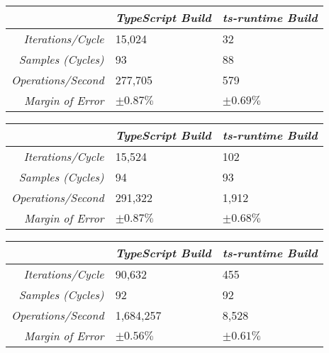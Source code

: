 \begin{center}
{
\centering
\tabulinesep=1.2mm
\setlength{\tabcolsep}{5mm}
\def\arraystretch{1.25}
\small
\begin{tabu} to \textwidth {|r||X[c,m]|X[c,m]|}
  \hline
  & \emph{TypeScript Build} & \emph{ts-runtime Build} \\
  \hline
  \hline
  \emph{Iterations/Cycle}  & 15,024 & 32 \\
  \hline
  \emph{Samples (Cycles)}  & 93 & 88 \\
  \hline
  \emph{Operations/Second} & 277,705 & 579 \\
  \hline
  \emph{Margin of Error}   & $\pm 0.87\%$ & $\pm 0.69\%$ \\
  \hline
\end{tabu}
}
\end{center}

\begin{center}
{
\centering
\tabulinesep=1.2mm
\setlength{\tabcolsep}{5mm}
\def\arraystretch{1.25}
\small
\begin{tabu} to \textwidth {|r||X[c,m]|X[c,m]|}
  \hline
  & \emph{TypeScript Build} & \emph{ts-runtime Build} \\
  \hline
  \hline
  \emph{Iterations/Cycle}  & 15,524 & 102 \\
  \hline
  \emph{Samples (Cycles)}  & 94 & 93 \\
  \hline
  \emph{Operations/Second} & 291,322 & 1,912 \\
  \hline
  \emph{Margin of Error}   & $\pm 0.87\%$ & $\pm 0.68\%$ \\
  \hline
\end{tabu}
}
\end{center}

\begin{center}
{
\centering
\tabulinesep=1.2mm
\setlength{\tabcolsep}{5mm}
\def\arraystretch{1.25}
\small
\begin{tabu} to \textwidth {|r||X[c,m]|X[c,m]|}
  \hline
  & \emph{TypeScript Build} & \emph{ts-runtime Build} \\
  \hline
  \hline
  \emph{Iterations/Cycle}  & 90,632 & 455 \\
  \hline
  \emph{Samples (Cycles)}  & 92 & 92 \\
  \hline
  \emph{Operations/Second} & 1,684,257 & 8,528 \\
  \hline
  \emph{Margin of Error}   & $\pm 0.56\%$ & $\pm 0.61\%$ \\
  \hline
\end{tabu}
}
\end{center}

